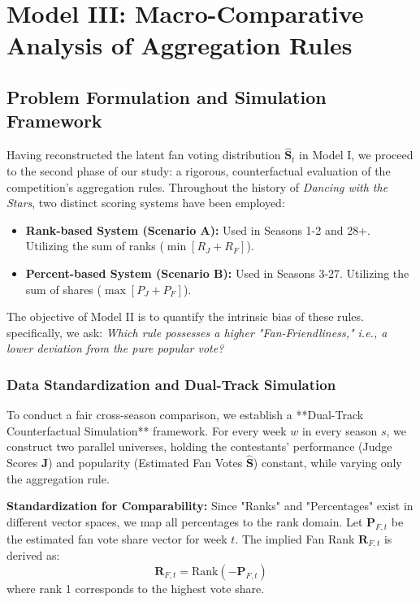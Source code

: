 \section{Model III: Macro-Comparative Analysis of Aggregation Rules}

\subsection{Problem Formulation and Simulation Framework}
Having reconstructed the latent fan voting distribution $\hat{\mathbf{S}}_t$ in Model I, we proceed to the second phase of our study: a rigorous, counterfactual evaluation of the competition's aggregation rules. Throughout the history of \textit{Dancing with the Stars}, two distinct scoring systems have been employed:
\begin{itemize}
    \item \textbf{Rank-based System (Scenario A):} Used in Seasons 1-2 and 28+. Utilizing the sum of ranks ($\min [R_J + R_F]$).
    \item \textbf{Percent-based System (Scenario B):} Used in Seasons 3-27. Utilizing the sum of shares ($\max [P_J + P_F]$).
\end{itemize}

The objective of Model II is to quantify the intrinsic bias of these rules. specifically, we ask: \textit{Which rule possesses a higher "Fan-Friendliness," i.e., a lower deviation from the pure popular vote?}

\subsubsection{Data Standardization and Dual-Track Simulation}
To conduct a fair cross-season comparison, we establish a **Dual-Track Counterfactual Simulation** framework. For every week $w$ in every season $s$, we construct two parallel universes, holding the contestants' performance (Judge Scores $\mathbf{J}$) and popularity (Estimated Fan Votes $\hat{\mathbf{S}}$) constant, while varying only the aggregation rule.

\textbf{Standardization for Comparability:}
Since "Ranks" and "Percentages" exist in different vector spaces, we map all percentages to the rank domain. Let $\mathbf{P}_{F,t}$ be the estimated fan vote share vector for week $t$. The implied Fan Rank $\mathbf{R}_{F,t}$ is derived as:
\begin{equation}
    \mathbf{R}_{F,t} = \text{Rank}(-\mathbf{P}_{F,t})
\end{equation}
where rank 1 corresponds to the highest vote share.

